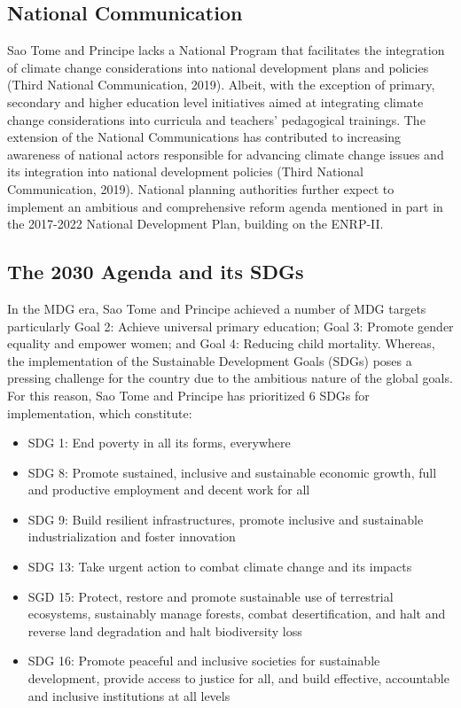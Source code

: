 \documentclass[
]{book}
\providecommand{\tightlist}{%
  \setlength{\itemsep}{0pt}\setlength{\parskip}{0pt}}
\begin{document}
\hypertarget{national-communication-1}{%
\subsection{National Communication}\label{national-communication-1}}

Sao Tome and Principe lacks a National Program that facilitates the integration of climate change considerations into national development plans and policies (Third National Communication, 2019). Albeit, with the exception of primary, secondary and higher education level initiatives aimed at integrating climate change considerations into curricula and teachers' pedagogical trainings. The extension of the National Communications has contributed to increasing awareness of national actors responsible for advancing climate change issues and its integration into national development policies (Third National Communication, 2019). National planning authorities further expect to implement an ambitious and comprehensive reform agenda mentioned in part in the 2017-2022 National Development Plan, building on the ENRP-II.

\hypertarget{the-2030-agenda-and-its-sdgs-1}{%
\subsection{The 2030 Agenda and its SDGs}\label{the-2030-agenda-and-its-sdgs-1}}

In the MDG era, Sao Tome and Principe achieved a number of MDG targets particularly Goal 2: Achieve universal primary education; Goal 3: Promote gender equality and empower women; and Goal 4: Reducing child mortality. Whereas, the implementation of the Sustainable Development Goals (SDGs) poses a pressing challenge for the country due to the ambitious nature of the global goals. For this reason, Sao Tome and Principe has prioritized 6 SDGs for implementation, which constitute:

\begin{itemize}
\tightlist
\item
  SDG 1: End poverty in all its forms, everywhere
\item
  SDG 8: Promote sustained, inclusive and sustainable economic growth, full and productive employment and decent work for all
\item
  SDG 9: Build resilient infrastructures, promote inclusive and sustainable industrialization and foster innovation
\item
  SDG 13: Take urgent action to combat climate change and its impacts
\item
  SGD 15: Protect, restore and promote sustainable use of terrestrial ecosystems, sustainably manage forests, combat desertification, and halt and reverse land degradation and halt biodiversity loss
\item
  SDG 16: Promote peaceful and inclusive societies for sustainable development, provide access to justice for all, and build effective, accountable and inclusive institutions at all levels
\end{itemize}
\end{document}
